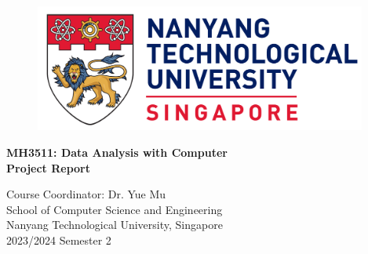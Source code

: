 \begin{titlepage}
	\begin{figure}[!t]
		\centering
		\includegraphics[width = 4.3in]{title/logo.pdf}
	\end{figure}
	
	\centering
	\huge{\textbf{MH3511: Data Analysis with Computer}}\\[0.2in]
	\huge{\textbf{Project Report}}\\[2in]
	
	
	\begin{table}[h]
		\centering
	\end{table}
	
	\Large{Course Coordinator: Dr. Yue Mu}\\[0.5in]
	
	
	\LARGE{School of Computer Science and Engineering}\\
	\LARGE{Nanyang Technological University, Singapore}\\[0.3in]
	
	
	\LARGE{2023/2024 Semester 2}
	\newpage
\end{titlepage}